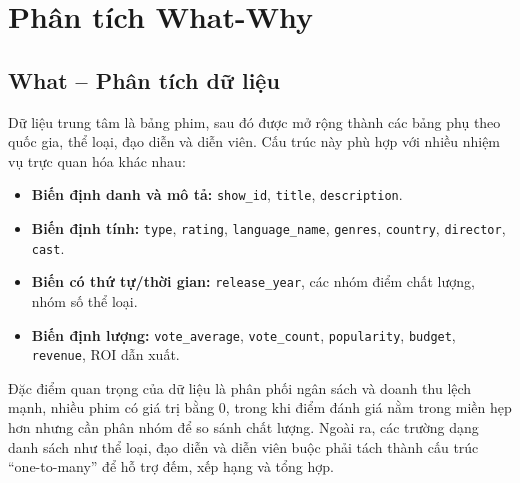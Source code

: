\section{Phân tích What-Why}

\subsection{What -- Phân tích dữ liệu}
Dữ liệu trung tâm là bảng phim, sau đó được mở rộng thành các bảng phụ theo quốc gia, thể loại, đạo diễn và diễn viên. Cấu trúc này phù hợp với nhiều nhiệm vụ trực quan hóa khác nhau:
\begin{itemize}[leftmargin=2em]
    \item \textbf{Biến định danh và mô tả:} \texttt{show\_id}, \texttt{title}, \texttt{description}.
    \item \textbf{Biến định tính:} \texttt{type}, \texttt{rating}, \texttt{language\_name}, \texttt{genres}, \texttt{country}, \texttt{director}, \texttt{cast}.
    \item \textbf{Biến có thứ tự/thời gian:} \texttt{release\_year}, các nhóm điểm chất lượng, nhóm số thể loại.
    \item \textbf{Biến định lượng:} \texttt{vote\_average}, \texttt{vote\_count}, \texttt{popularity}, \texttt{budget}, \texttt{revenue}, ROI dẫn xuất.
\end{itemize}

Đặc điểm quan trọng của dữ liệu là phân phối ngân sách và doanh thu lệch mạnh, nhiều phim có giá trị bằng 0, trong khi điểm đánh giá nằm trong miền hẹp hơn nhưng cần phân nhóm để so sánh chất lượng. Ngoài ra, các trường dạng danh sách như thể loại, đạo diễn và diễn viên buộc phải tách thành cấu trúc ``one-to-many'' để hỗ trợ đếm, xếp hạng và tổng hợp.

